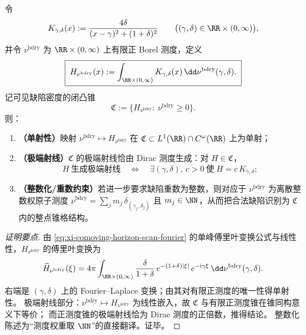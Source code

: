 



\begin{proposition}\label{prop:xi-defect-density-cone-choquet-extreme}
令
\[
K_{\gamma,\delta}(x):=\frac{4\delta}{(x-\gamma)^2+(1+\delta)^2}\qquad\bigl((\gamma,\delta)\in\RR\times(0,\infty)\bigr),
\]
并令 \(\nu^{\mathrm{bdry}}\) 为 \(\RR\times(0,\infty)\) 上有限正 Borel 测度，定义
\begin{equation}\label{eq:xi-defect-density-Hnu}
\boxed{\;
H_{\nu^{\mathrm{bdry}}}(x):=\int_{\RR\times(0,\infty)}K_{\gamma,\delta}(x)\,\dd\nu^{\mathrm{bdry}}(\gamma,\delta).\;}
\end{equation}
记可见缺陷密度的闭凸锥
\[
\mathfrak{C}:=\{H_{\nu^{\mathrm{bdry}}}:\ \nu^{\mathrm{bdry}}\ge 0\}.
\]
则：
\begin{enumerate}
  \item \textbf{（单射性）}映射 \(\nu^{\mathrm{bdry}}\mapsto H_{\nu^{\mathrm{bdry}}}\) 在 \(\mathfrak{C}\subset L^1(\RR)\cap C^{\omega}(\RR)\) 上为单射；
  \item \textbf{（极端射线）}\(\mathfrak{C}\) 的极端射线恰由 Dirac 测度生成：对 \(H\in\mathfrak{C}\)，
  \[
  H\ \text{生成极端射线}
  \quad\Longleftrightarrow\quad
  \exists(\gamma,\delta),\,c>0\ \text{使}\ H=c\,K_{\gamma,\delta};
  \]
  \item \textbf{（整数化/重数约束）}若进一步要求缺陷重数为整数，则对应于 \(\nu^{\mathrm{bdry}}\) 为离散整数权原子测度
  \(
  \nu^{\mathrm{bdry}}=\sum_j m_j\,\delta_{(\gamma_j,\delta_j)}
  \)
  且 \(m_j\in\NN\)，从而把合法缺陷识别为 \(\mathfrak{C}\) 内的整点锥格结构。
\end{enumerate}
\end{proposition}

\begin{proof}[证明要点]
由 \eqref{eq:xi-comoving-horizon-scan-fourier} 的单峰傅里叶变换公式与线性性，\(H_{\nu^{\mathrm{bdry}}}\) 的傅里叶变换为
\[
\widehat H_{\nu^{\mathrm{bdry}}}(\xi)
=4\pi\int_{\RR\times(0,\infty)}\frac{\delta}{1+\delta}\,e^{-(1+\delta)|\xi|}\,e^{-\mathrm{i}\gamma\xi}\,\dd\nu^{\mathrm{bdry}}(\gamma,\delta).
\]
右端是 \((\gamma,\delta)\) 上的 Fourier--Laplace 变换；由其对有限正测度的唯一性得单射性。
极端射线部分：\(\nu^{\mathrm{bdry}}\mapsto H_{\nu^{\mathrm{bdry}}}\) 为线性嵌入，故 \(\mathfrak{C}\) 与有限正测度锥在锥同构意义下等价；
而正测度锥的极端射线恰为 Dirac 测度的正倍数，推得结论。
整数化陈述为“测度权重取 \(\NN\)”的直接翻译。证毕。
\end{proof}

